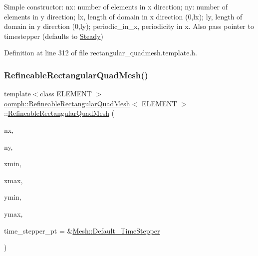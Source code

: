 Simple constructor\+: nx\+: number of elements in x direction; ny\+: number of elements in y direction; lx, length of domain in x direction (0,lx); ly, length of domain in y direction (0,ly); periodic\+\_\+in\+\_\+x, periodicity in x. Also pass pointer to timestepper (defaults to \hyperlink{classoomph_1_1Steady}{Steady}) 



Definition at line 312 of file rectangular\+\_\+quadmesh.\+template.\+h.

\mbox{\label{classoomph_1_1RefineableRectangularQuadMesh_ad4e8f11be4917fe7eeb9de2213a98f7b}} 
\subsubsection{\texorpdfstring{Refineable\+Rectangular\+Quad\+Mesh()}{RefineableRectangularQuadMesh()}\hspace{0.1cm}{\footnotesize\ttfamily [3/4]}}
{\footnotesize\ttfamily template$<$class E\+L\+E\+M\+E\+NT $>$ \\
\hyperlink{classoomph_1_1RefineableRectangularQuadMesh}{oomph\+::\+Refineable\+Rectangular\+Quad\+Mesh}$<$ E\+L\+E\+M\+E\+NT $>$\+::\hyperlink{classoomph_1_1RefineableRectangularQuadMesh}{Refineable\+Rectangular\+Quad\+Mesh} (\begin{DoxyParamCaption}\item[{const unsigned \&}]{nx,  }\item[{const unsigned \&}]{ny,  }\item[{const double \&}]{xmin,  }\item[{const double \&}]{xmax,  }\item[{const double \&}]{ymin,  }\item[{const double \&}]{ymax,  }\item[{\hyperlink{classoomph_1_1TimeStepper}{Time\+Stepper} $\ast$}]{time\+\_\+stepper\+\_\+pt = {\ttfamily \&\hyperlink{classoomph_1_1Mesh_a12243d0fee2b1fcee729ee5a4777ea10}{Mesh\+::\+Default\+\_\+\+Time\+Stepper}} }\end{DoxyParamCaption})\hspace{0.3cm}{\ttfamily [inline]}}



